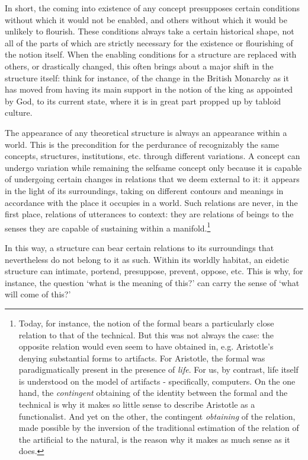 \documentclass[]{article}
\begin{document}
In short, the coming into existence of any concept presupposes certain conditions without which it would not be enabled, and others without which it would be unlikely to flourish. These conditions always take a certain historical shape, not all of the parts of which are strictly necessary for the existence or flourishing of the notion itself. When the enabling conditions for a structure are replaced with others, or drastically changed, this often brings about a major shift in the structure itself: think for instance, of the change in the British Monarchy as it has moved from having its main support in the notion of the king as appointed by God, to its current state, where it is in great part propped up by tabloid culture.

The appearance of any theoretical structure is always an appearance within a world. This is the precondition for the perdurance of recognizably the same concepts, structures, institutions, etc. through different variations. A concept can undergo variation while remaining the selfsame concept only because it is capable of undergoing certain changes in relations that we deem external to it: it appears in the light of its surroundings, taking on different contours and meanings in accordance with the place it occupies in a world. Such relations are never, in the first place, relations of utterances to context: they are relations of beings to the senses they are capable of sustaining within a manifold.\footnote{Today, for instance, the notion of the formal bears a particularly close relation to that of the technical. But this was not always the case: the opposite relation would even seem to have obtained in, e.g. Aristotle's denying substantial forms to artifacts. For Aristotle, the formal was paradigmatically present in the presence of \textit{life}. For us, by contrast, life itself is understood on the model of artifacts - specifically, computers. On the one hand, the \textit{contingent} obtaining of the identity between the formal and the technical is why it makes so little sense to describe Aristotle as a functionalist. And yet on the other, the contingent \textit{obtaining} of the relation, made possible by the inversion of the traditional estimation of the relation of the artificial to the natural, is the reason why it makes as much sense as it does.}

In this way, a structure can bear certain relations to its surroundings that nevertheless do not belong to it as such. Within its worldly habitat, an eidetic structure can intimate, portend, presuppose, prevent, oppose, etc. This is why, for instance, the question `what is the meaning of this?' can carry the sense of `what will come of this?'
\end{document}
